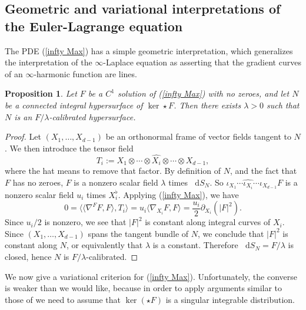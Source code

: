 \documentclass[reqno,11pt]{amsart}
\newcommand*\dif{\mathop{}\!\mathrm{d}}
\newtheorem{proposition}[theorem]{Proposition}
\theoremstyle{definition}
\numberwithin{equation}{section}
\begin{document}
\subsection{Geometric and variational interpretations of the Euler-Lagrange equation}\label{EL interpretation}
The PDE (\ref{infty Max}) has a simple geometric interpretation, which generalizes the interpretation of the $\infty$-Laplace equation as asserting that the gradient curves of an $\infty$-harmonic function are lines.

\begin{proposition}\label{infty Max calibrates}
Let $F$ be a $C^1$ solution of (\ref{infty Max}) with no zeroes, and let $N$ be a connected integral hypersurface of $\ker \star F$.
Then there exists $\lambda > 0$ such that $N$ is an $F/\lambda$-calibrated hypersurface.
\end{proposition}
\begin{proof}
Let $(X_1, \dots, X_{d - 1})$ be an orthonormal frame of vector fields tangent to $N$.
We then introduce the tensor field
$$T_i := X_1 \otimes \cdots \otimes \widehat{X_i} \otimes \cdots \otimes X_{d - 1},$$
where the hat means to remove that factor.
By definition of $N$, and the fact that $F$ has no zeroes, $F$ is a nonzero scalar field $\lambda$ times $\dif S_N$.
So $\iota_{X_1} \cdots \widehat{\iota_{X_i}} \cdots \iota_{X_{d - 1}} F$ is a nonzero scalar field $u_i$ times $X_i^\flat$.
Applying (\ref{infty Max}), we have 
$$0 = \langle \langle \nabla^F F, F\rangle, T_i\rangle = u_i \langle \nabla_{X_i} F, F \rangle = \frac{u_i}{2} \partial_{X_i} (|F|^2).$$
Since $u_i/2$ is nonzero, we see that $|F|^2$ is constant along integral curves of $X_i$.
Since $(X_1, \dots, X_{d - 1})$ spans the tangent bundle of $N$, we conclude that $|F|^2$ is constant along $N$, or equivalently that $\lambda$ is a constant.
Therefore $\dif S_N = F/\lambda$ is closed, hence $N$ is $F/\lambda$-calibrated.
\end{proof}

We now give a variational criterion for (\ref{infty Max}).
Unfortunately, the converse is weaker than we would like, because in order to apply arguments similar to those of \cite{Aronsson67,Sheffield12} we need to assume that $\ker(\star F)$ is a singular integrable distribution.
\end{document}
